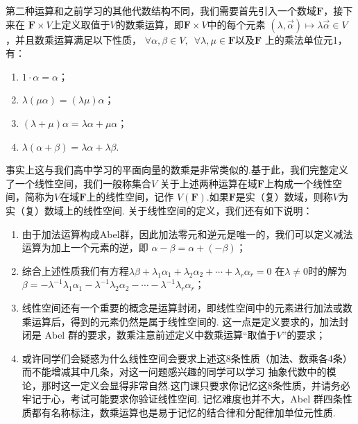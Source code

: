 第二种运算和之前学习的其他代数结构不同，我们需要首先引入一个数域$\mathbf{F}$，接下来在
$\mathbf{F}\times V$上定义取值于$V$的数乘运算，即$\mathbf{F}\times V$中的每个元素
$(\lambda,\vec{\alpha})\mapsto \lambda\vec{\alpha}\in V$，并且数乘运算满足以下性质，
$\forall \alpha,\beta \in V,\enspace\forall \lambda,\mu\in\mathbf{F}$以及$\mathbf{F}$
上的乘法单位元1，有：
\begin{enumerate}
    \item $1\cdot \alpha=\alpha$；

    \item $\lambda(\mu\alpha)=(\lambda\mu)\alpha$；

    \item $(\lambda+\mu)\alpha=\lambda\alpha+\mu\alpha$；

    \item $\lambda(\alpha+\beta)=\lambda\alpha+\lambda\beta$.
\end{enumerate}

事实上这与我们高中学习的平面向量的数乘是非常类似的.基于此，我们完整定义了一个线性空间，我们一般称集合$V$
关于上述两种运算在域$\mathbf{F}$上构成一个线性空间，简称为$V$在域$\mathbf{F}$上的线性空间，记作
$V(\mathbf{F})$.如果$\mathbf{F}$是实（复）数域，则称$V$为实（复）数域上的线性空间.
关于线性空间的定义，我们还有如下说明：
\begin{enumerate}
    \item 由于加法运算构成Abel群，因此加法零元和逆元是唯一的，我们可以定义减法运算为加上一个元素的逆，即
    $\alpha-\beta=\alpha+(-\beta)$；
    \item 综合上述性质我们有方程$\lambda\beta+\lambda_1\alpha_1+\lambda_2\alpha_2+\cdots+\lambda_r\alpha_r=0$
    在$\lambda\neq 0$时的解为$\beta=-\lambda^{-1}\lambda_1\alpha_1-\lambda^{-1}\lambda_2\alpha_2-\cdots-\lambda^{-1}\lambda_r\alpha_r$；
    \item 线性空间还有一个重要的概念是运算封闭，即线性空间中的元素进行加法或数乘运算后，得到的元素仍然是属于线性空间的.
    这一点是定义要求的，加法封闭是 Abel 群的要求，数乘注意前述定义中数乘运算``取值于$V$''的要求；
    \item 或许同学们会疑惑为什么线性空间会要求上述这8条性质（加法、数乘各4条）而不能增减其中几条，对这一问题感兴趣的同学可以学习
    抽象代数中的模论，那时这一定义会显得非常自然.这门课只要求你记忆这8条性质，并请务必牢记于心，考试可能要求你验证线性空间.
    记忆难度也并不大，Abel 群四条性质都有名称标注，数乘运算也是易于记忆的结合律和分配律加单位元性质.
\end{enumerate}

